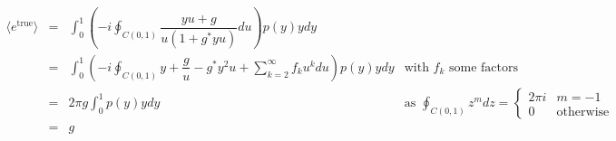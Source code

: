 \documentclass[a4paper]{article}
\begin{document}
$$
\begin{array}{rcll}
\langle e^\text{true}\rangle
&=& {\displaystyle \int_0^1 \left( -i \oint_{C(0,1)} \dfrac{yu+g}{u(1+g^*yu)} du \right) p(y)ydy } & \\
&=& {\displaystyle \int_0^1 \left( -i \oint_{C(0,1)} y+\dfrac{g}{u}-g^*y^2u+\sum_{k=2}^\infty f_k u^k du \right) p(y)ydy } & \text{with $f_k$ some factors} \\
&=& 2\pi g {\displaystyle \int_0^1 p(y)ydy } & \text{as } {\displaystyle \oint_{C(0,1)} z^m dz =\left\{\begin{array}{ll} 2\pi i & m=-1 \\ 0 & \text{otherwise} \end{array}\right.} \\
&=& g & \\
\end{array}
$$
\end{document}
